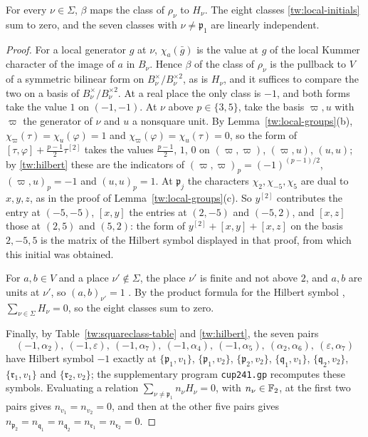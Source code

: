 \begin{lemma}\label{tw:local-forms}
For every $\nu\in\Sigma$, $\beta$ maps the class of $\rho_\nu$ to $H_\nu$. The
eight classes \eqref{tw:local-initials} sum to zero, and the seven classes
with $\nu\ne\mathfrak p_1$ are linearly independent.
\end{lemma}

\begin{proof}
For a local generator $g$ at $\nu$, $\chi_a(\bar g)$ is the value at $g$ of
the local Kummer character of the image of $a$ in $B_\nu$. Hence
$\beta$ of the class of $\rho_\nu$ is the pullback to $V$ of a symmetric
bilinear form on $B_\nu^\times/B_\nu^{\times2}$, as is $H_\nu$, and it
suffices to compare the two on a basis of $B_\nu^\times/B_\nu^{\times2}$. At a
real place the only class is $-1$, and both forms take the value $1$ on
$(-1,-1)$. At $\nu$ above $p\in\{3,5\}$, take the basis $\varpi,u$ with
$\varpi$ the generator of $\nu$ and $u$ a nonsquare unit. By
Lemma~\ref{tw:local-groups}(b), $\chi_\varpi(\tau)=\chi_u(\varphi)=1$ and
$\chi_\varpi(\varphi)=\chi_u(\tau)=0$, so the form of
$[\tau,\varphi]+\frac{p-1}2\tau^{[2]}$ takes the values $\frac{p-1}2$, $1$,
$0$ on $(\varpi,\varpi)$, $(\varpi,u)$, $(u,u)$; by \eqref{tw:hilbert} these
are the indicators of $(\varpi,\varpi)_p=(-1)^{(p-1)/2}$, $(\varpi,u)_p=-1$
and $(u,u)_p=1$. At $\mathfrak p_j$ the characters $\chi_2,\chi_{-5},\chi_5$
are dual to $x,y,z$, as in the proof of Lemma~\ref{tw:local-groups}(c). So
$y^{[2]}$ contributes the entry at $(-5,-5)$, $[x,y]$ the entries at $(2,-5)$
and $(-5,2)$, and $[x,z]$ those at $(2,5)$ and $(5,2)$: the form of
$y^{[2]}+[x,y]+[x,z]$ on the basis $2,-5,5$ is the matrix of the Hilbert
symbol displayed in that proof, from which this initial was obtained.

For $a,b\in V$ and a place $\nu'\notin\Sigma$, the place $\nu'$ is finite
and not above $2$, and $a,b$ are units at $\nu'$, so $(a,b)_{\nu'}=1$
\cite[Chapter~VIII, 5.8]{MilneCFT}. By the
product formula for the Hilbert symbol \cite[Chapter~V, Example~5.4]{MilneCFT},
$\sum_{\nu\in\Sigma}H_\nu=0$, so the eight classes sum to zero.

Finally, by Table~\ref{tw:squareclass-table} and \eqref{tw:hilbert}, the
seven pairs
\[
 (-1,\alpha_2),\ (-1,\varepsilon),\ (-1,\alpha_7),\ (-1,\alpha_4),\
 (-1,\alpha_5),\ (\alpha_2,\alpha_6),\ (\varepsilon,\alpha_7)
\]
have Hilbert symbol $-1$ exactly at $\{\mathfrak p_1,v_1\}$,
$\{\mathfrak p_1,v_2\}$, $\{\mathfrak p_2,v_2\}$, $\{\mathfrak q_1,v_1\}$,
$\{\mathfrak q_2,v_2\}$, $\{\mathfrak r_1,v_1\}$ and $\{\mathfrak r_2,v_2\}$;
the supplementary program \texttt{cup241.gp} recomputes these symbols.
Evaluating a relation $\sum_{\nu\ne\mathfrak p_1}n_\nu H_\nu=0$, with
$n_\nu\in\mathbb F_2$, at the first two pairs gives $n_{v_1}=n_{v_2}=0$, and then
at the other five pairs gives
$n_{\mathfrak p_2}=n_{\mathfrak q_1}=n_{\mathfrak q_2}=n_{\mathfrak r_1}=n_{\mathfrak r_2}=0$.
\end{proof}

